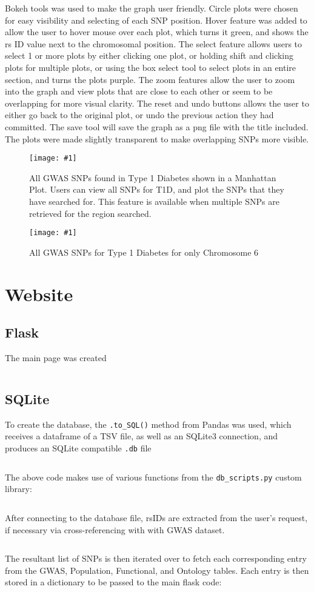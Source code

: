 \documentclass[12pt,a4paper]{article}
\newcommand{\mintfile}[1]{
\begin{tcolorbox}[colback=gray!5!white,%
	grow to left by=20mm,
    grow to right by=20mm,
    sharp corners]{{    \small \inputminted[breaklines]{python}{#1}		}}
\end{tcolorbox}}
\newcommand{\sect}[1]{
\FloatBarrier %
\hypertarget{#1}{
\section{#1}\label{#1}}
}
\newcommand{\subsect}[1]{
\hypertarget{#1}{
\subsection{#1}\label{#1}}
}
\newcommand{\pic}[2]{
\begin{figure}[h]
    \centering
    \captionsetup{justification=centering}
    \texttt{[image: \#1]}
    \caption{#2}
    \label{#1}
\end{figure}
}
\begin{document}
\mintfile{code_snippets/manPlot/createManPlot.py}
Bokeh tools was used to make the graph user friendly. Circle plots were chosen for easy visibility and selecting of each SNP position. Hover feature was added to allow the user to hover mouse over each plot, which turns it green, and shows the rs ID value next to the chromosomal position. The select feature allows users to select 1 or more plots by either clicking one plot, or holding shift and clicking plots for multiple plots, or using the box select tool to select plots in an entire section, and turns the plots purple. The zoom features allow the user to zoom into the graph and view plots that are close to each other or seem to be overlapping for more visual clarity. The reset and undo buttons allows the user to either go back to the original plot, or undo the previous action they had committed. The save tool will save the graph as a png file with the title included. The plots were made slightly transparent to make overlapping SNPs more visible.

\pic{manplot1}{All GWAS SNPs found in Type 1 Diabetes shown in a Manhattan Plot.
Users can view all SNPs for T1D, and plot the SNPs that they have searched for.
This feature is available when multiple SNPs are retrieved for the region searched.}

\pic{manplot2}{All GWAS SNPs for Type 1 Diabetes for only Chromosome 6}

\sect{Website}

\subsect{Flask}

The main page was created

\mintfile{code_snippets/flask/snp.py}

\subsect{SQLite}

To create the database, the \texttt{.to\_SQL()} method from Pandas was used, which receives a dataframe of a TSV file,
as well as an SQLite3 connection, and produces an SQLite compatible \texttt{.db} file

\mintfile{code_snippets/SQL/create_db.py}
The above code makes use of various functions from the \texttt{db\_scripts.py} custom library:

\mintfile{code_snippets/SQL/pdDB.py}

After connecting to the database file, rsIDs are extracted from the user's request,
if necessary via cross-referencing with with GWAS dataset.

\mintfile{code_snippets/SQL/DBreq1.py}

The resultant list of SNPs is then iterated over to fetch each corresponding entry from the
GWAS, Population, Functional, and Ontology tables.
Each entry is then stored in a dictionary to be passed to the main flask code:
\end{document}
